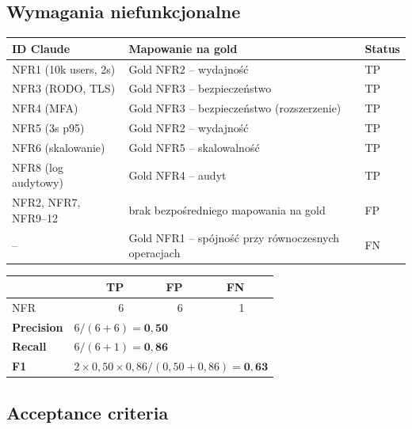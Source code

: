 \documentclass[12pt,a4paper]{article}
\newcommand{\tp}[1]{\colorbox{tpcolor}{\small #1}}
\newcommand{\fp}[1]{\colorbox{fpcolor}{\small #1}}
\newcommand{\fn}[1]{\colorbox{fncolor}{\small #1}}
\begin{document}
\vspace{1em}
\subsection{Wymagania niefunkcjonalne}

\begin{tabular}{p{2.5cm} p{7cm} l}
\toprule
\textbf{ID Claude} & \textbf{Mapowanie na gold} & \textbf{Status} \\
\midrule
NFR1 (10k users, 2s) & Gold NFR2 -- wydajność & \tp{TP} \\
NFR3 (RODO, TLS)     & Gold NFR3 -- bezpieczeństwo & \tp{TP} \\
NFR4 (MFA)           & Gold NFR3 -- bezpieczeństwo (rozszerzenie) & \tp{TP} \\
NFR5 (3s p95)        & Gold NFR2 -- wydajność & \tp{TP} \\
NFR6 (skalowanie)    & Gold NFR5 -- skalowalność & \tp{TP} \\
NFR8 (log audytowy)  & Gold NFR4 -- audyt & \tp{TP} \\
NFR2, NFR7, NFR9--12 & brak bezpośredniego mapowania na gold & \fp{FP} \\
\midrule
-- & Gold NFR1 -- spójność przy równoczesnych operacjach & \fn{FN} \\
\bottomrule
\end{tabular}

\vspace{0.5em}
\begin{tabular}{lrrrr}
\toprule
& \textbf{TP} & \textbf{FP} & \textbf{FN} & \\
\midrule
NFR & 6 & 6 & 1 & \\
\midrule
\textbf{Precision} & \multicolumn{4}{l}{$6 / (6+6) = \mathbf{0{,}50}$} \\
\textbf{Recall}    & \multicolumn{4}{l}{$6 / (6+1) = \mathbf{0{,}86}$} \\
\textbf{F1}        & \multicolumn{4}{l}{$2 \times 0{,}50 \times 0{,}86 / (0{,}50+0{,}86) = \mathbf{0{,}63}$} \\
\bottomrule
\end{tabular}

\vspace{1em}
\subsection{Acceptance criteria}
\end{document}
